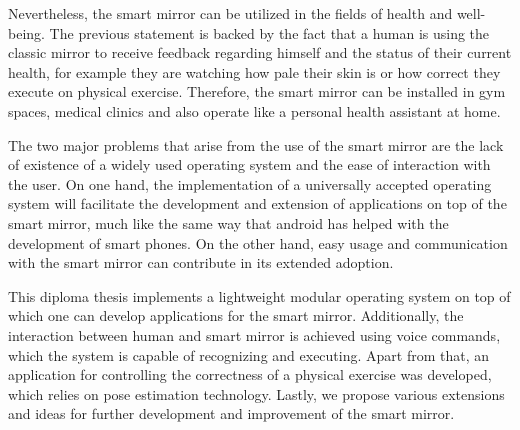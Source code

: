 Nevertheless, the smart mirror can be utilized in the fields of health and well-being. The previous statement is backed by the fact that a human is using the classic mirror to receive feedback regarding himself and the status of their current health, for example they are watching how pale their skin is or how correct they execute on physical exercise. Therefore, the smart mirror can be installed in gym spaces, medical clinics and also operate like a personal health assistant at home.

The two major problems that arise from the use of the smart mirror are the lack of existence of a widely used operating system and the ease of interaction with the user. On one hand, the implementation of a universally accepted operating system will facilitate the development and extension of applications on top of the smart mirror, much like the same way that android has helped with the development of smart phones. On the other hand, easy usage and communication with the smart mirror can contribute in its extended adoption.

This diploma thesis implements a lightweight modular operating system on top of which one can develop applications for the smart mirror. Additionally, the interaction between human and smart mirror is achieved using voice commands, which the system is capable of recognizing and executing. Apart from that, an application for controlling the correctness of a physical exercise was developed, which relies on pose estimation technology. Lastly, we propose various extensions and ideas for further development and improvement of the smart mirror.